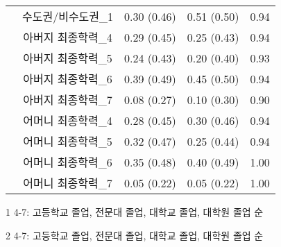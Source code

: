 \documentclass{article}
\begin{document}
\begin{table}[t]
{\begin{threeparttable}
\begin{tabular}{cc|cc|c}
& 수도권/비수도권\_1  & 0.30 (0.46)       & 0.51 (0.50)        & 0.94                                       \\
& 아버지 최종학력\_4\tnote{1}  & 0.29 (0.45)           & 0.25 (0.43)            & 0.94                                          \\
& 아버지 최종학력\_5  & 0.24 (0.43)       & 0.20 (0.40)        & 0.93                                       \\
& 아버지 최종학력\_6  & 0.39 (0.49)       & 0.45 (0.50)        & 0.94                                       \\
& 아버지 최종학력\_7  & 0.08 (0.27)       & 0.10 (0.30)        & 0.90                                       \\
& 어머니 최종학력\_4\tnote{2}  & 0.28 (0.45)           & 0.30 (0.46)            & 0.94                                          \\
& 어머니 최종학력\_5  & 0.32 (0.47)       & 0.25 (0.44)        & 0.94                                       \\
& 어머니 최종학력\_6  & 0.35 (0.48)       & 0.40 (0.49)        & 1.00                                       \\
& 어머니 최종학력\_7  & 0.05 (0.22)       & 0.05 (0.22)        & 1.00                                       \\ \hline
\end{tabular}
\begin{tablenotes}
    \item[1] 4-7: 고등학교 졸업, 전문대 졸업, 대학교 졸업, 대학원 졸업 순
    \item[2] 4-7: 고등학교 졸업, 전문대 졸업, 대학교 졸업, 대학원 졸업 순
  \end{tablenotes}
\end{threeparttable}}
\end{table}
\end{document}
